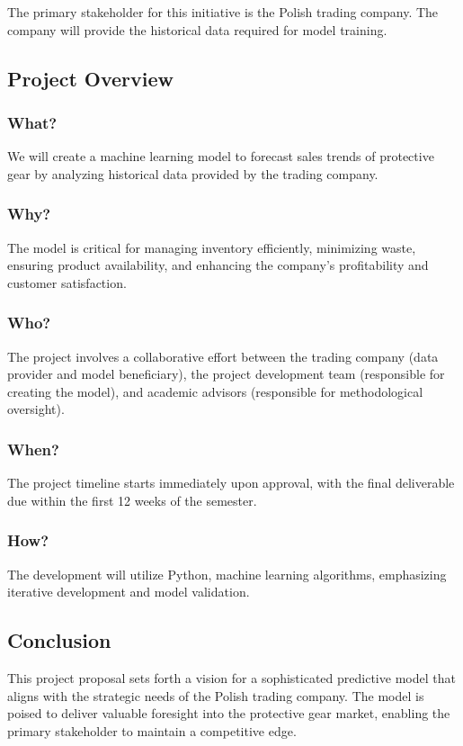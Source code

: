 \documentclass{article}
\begin{document}
The primary stakeholder for this initiative is the Polish trading company. The company will provide the historical data required for model training.

\subsection{Project Overview}

\subsubsection{What?}
We will create a machine learning model to forecast sales trends of protective gear by analyzing historical data provided by the trading company.

\subsubsection{Why?}
The model is critical for managing inventory efficiently, minimizing waste, ensuring product availability, and enhancing the company's profitability and customer satisfaction.

\subsubsection{Who?}
The project involves a collaborative effort between the trading company (data provider and model beneficiary), the project development team (responsible for creating the model), and academic advisors (responsible for methodological oversight).

\subsubsection{When?}
The project timeline starts immediately upon approval, with the final deliverable due within the first 12 weeks of the semester.

\subsubsection{How?}
The development will utilize Python, machine learning algorithms, emphasizing iterative development and model validation.

\subsection{Conclusion}

This project proposal sets forth a vision for a sophisticated predictive model that aligns with the strategic needs of the Polish trading company. The model is poised to deliver valuable foresight into the protective gear market, enabling the primary stakeholder to maintain a competitive edge.
\end{document}
